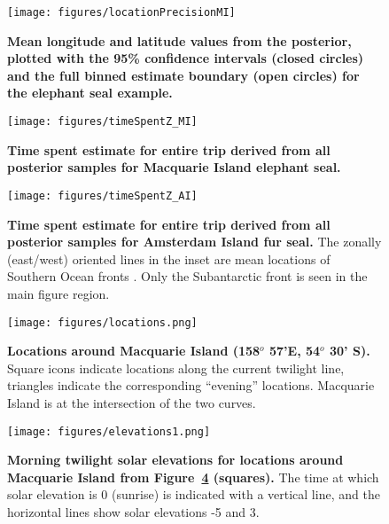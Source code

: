 \documentclass[10pt]{article}
\begin{document}
\begin{figure}[htbp]
  \begin{center}
\texttt{[image: figures/locationPrecisionMI]}
\end{center}
\caption{
{\bf Mean longitude and latitude values from the posterior,
  plotted with the 95\% confidence intervals (closed circles) and the
  full binned estimate boundary (open circles) for the elephant seal
  example. }
}
  \label{fig:locationPrecisionMI}
\end{figure}



\begin{figure}[htbp]
  \begin{center}
\texttt{[image: figures/timeSpentZ\_MI]}
\end{center}
\caption{
{\bf Time spent estimate for entire trip derived from all posterior
  samples for Macquarie Island elephant seal.}
}
  \label{fig:timeSpentZ_MI}
\end{figure}





\begin{figure}[htbp]
  \begin{center}
\texttt{[image: figures/timeSpentZ\_AI]}
\end{center}
\caption{
{\bf Time spent estimate for entire trip derived from all
  posterior samples for Amsterdam Island fur seal.} The zonally
  (east/west) oriented lines in the inset are mean locations of
  Southern Ocean fronts \cite{orsi1995mea}. Only the Subantarctic
  front is seen in the main figure region.  }
  \label{fig:timeSpentZ_AI}
\end{figure}


\begin{figure}[htbp]
  \begin{center}
\texttt{[image: figures/locations.png]}
\end{center}
\caption{
{\bf Locations around Macquarie Island (158$^o$ 57'E, 54$^o$ 30'
  S).} Square icons indicate locations along the current twilight line,
  triangles indicate the corresponding ``evening''
  locations. Macquarie Island is at the intersection of the two
  curves.}
  \label{fig:locations}
\end{figure}

\begin{figure}[htbp]
  \begin{center}
\texttt{[image: figures/elevations1.png]}
\end{center}
\caption{
{\bf Morning twilight solar elevations for locations around
  Macquarie Island from Figure~\ref{fig:locations} (squares).} The time
  at which solar elevation is 0 (sunrise) is indicated with a
  vertical line, and the horizontal lines show solar elevations -5 and
  3.}
  \label{fig:elevations1}
\end{figure}
\end{document}
